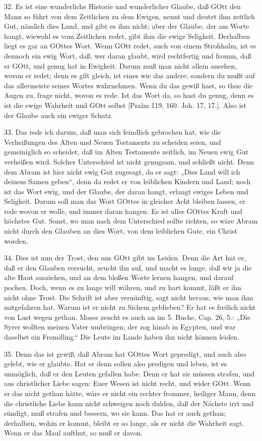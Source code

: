 32. Es ist eine wunderliche Historie und wunderlicher Glaube, daß GOtt den Mann so führt von dem Zeitlichen zu dem Ewigen, nennt und deutet ihm zeitlich Gut, nämlich dies Land, und gibt es ihm nicht; aber der Glaube, der am Worte hangt, wiewohl es vom Zeitlichen redet, gibt ihm die ewige Seligkeit. Derhalben liegt es gar an GOttes Wort. Wenn GOtt redet, auch von einem Strohhalm, ist es dennoch ein ewig Wort, daß, wer daran glaubt, wird rechtfertig und fromm, daß er GOtt, und genug hat in Ewigkeit. Darum muß man nicht allein ansehen, wovon er redet; denn es gilt gleich, ist eines wie das andere; sondern du mußt auf das allermeiste seines Wortes wahrnehmen. Wenn du das gewiß hast, so thue die Augen zu, frage nicht, wovon es rede. Ist das Wort da, so hast du genug, denn es ist die ewige Wahrheit und GOtt selbst [Psalm 119, 160. Joh. 17, 17.]. Also ist der Glaube auch ein ewiger Schatz.

33. Das rede ich darum, daß man sich feindlich gebrochen hat, wie die Verheißungen des Alten und Neuen Testaments zu scheiden seien, und gemeiniglich so scheidet, daß im Alten Testamente zeitlich, im Neuen ewig Gut verheißen wird. Solcher Unterschied ist nicht genugsam, und schließt nicht. Denn dem Abram ist hier nicht ewig Gut zugesagt, da er sagt: „Dies Land will ich deinem Samen geben“, denn da redet er von leiblichen Kindern und Land; noch ist das Wort ewig, und der Glaube, der daran hangt, erlangt ewiges Leben und Seligkeit. Darum soll man das Wort GOttes in gleicher Acht bleiben lassen, er rede wovon er wolle, und immer daran hangen. Es ist alles GOttes Kraft und höchstes Gut. Sonst, wo man nach dem Unterschied sollte richten, so wäre Abram nicht durch den Glauben an dies Wort, von dem leiblichen Gute, ein Christ worden.

34. Dies ist nun der Trost, den uns GOtt gibt im Leiden. Denn die Art hat er, daß er den Glauben versucht, zeucht ihn auf, und macht es lange, daß wir ja die alte Haut ausziehen, und an dem bloßen Worte lernen hangen, und darauf pochen. Doch, wenn es zu lange will währen, und zu hart kommt, läßt er ihn nicht ohne Trost. Die Schrift ist aber vernünftig, sagt nicht heraus, wie man ihm mitgefahren hat. Warum ist er nicht zu Sichem geblieben? Er hat es freilich nicht von Lust wegen gethan. Moses zeucht es auch an im 5. Buche, Cap. 26, 5.: „Die Syrer wollten meinen Vater umbringen; der zog hinab in Egypten, und war daselbst ein Fremdling.“ Die Leute im Lande haben ihn nicht können leiden.

35. Denn das ist gewiß, daß Abram hat GOttes Wort gepredigt, und auch also gelebt, wie er glaubte. Hat er denn sollen also predigen und leben, ist es unmöglich, daß er den Leuten gefallen habe. Denn er hat sie müssen strafen, und aus christlicher Liebe sagen: Euer Wesen ist nicht recht, und wider GOtt. Wenn er das nicht gethan hätte, wäre er nicht ein rechter frommer, heiliger Mann, denn die christliche Liebe kann nicht schweigen noch dulden, daß der Nächste irrt und sündigt, muß strafen und bessern, wo sie kann. Das hat er auch gethan; derhalben, wohin er kommt, bleibt er so lange, als er nicht die Wahrheit sagt. Wenn er das Maul aufthut, so muß er davon.

